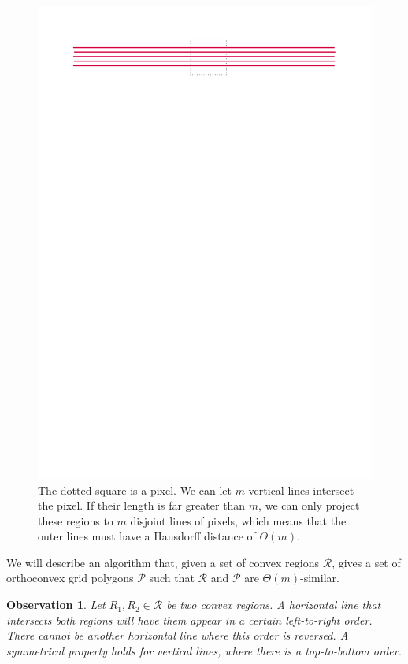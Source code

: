 \documentclass[a4paper,UKenglish,cleveref]{lipics-v2019}
\newtheorem{observation}{Observation}
\begin{document}
\begin{figure}
\centering
\includegraphics[scale=0.8]{Figures/linesexample.pdf}
\caption{The dotted square is a pixel. We can let $m$ vertical lines intersect the pixel. If their length is far greater than $m$, we can only project these regions to $m$ disjoint lines of pixels, which means that the outer lines must have a Hausdorff distance of $\Theta(m)$.}
\label{fig:linesexample}
\end{figure}

We will describe an algorithm that, given a set of convex regions \(\mathcal{R}\), gives a set of orthoconvex grid polygons \(\mathcal{P}\) such that \(\mathcal{R}\) and \(\mathcal{P}\) are \(\Theta(m)\)-similar.

\begin{observation}\label{obs:convex-ordering}
Let \(R_1,R_2 \in \mathcal{R}\) be two convex regions. A horizontal line that intersects both regions will have them appear in a certain left-to-right order. There cannot be another horizontal line where this order is reversed. A symmetrical property holds for vertical lines, where there is a top-to-bottom order.
\end{observation}
\end{document}
